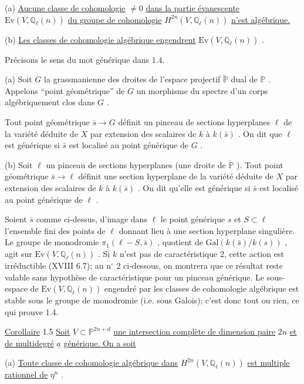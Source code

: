 (a) \underline{Aucune classe de cohomologie} $\neq 0$ \underline{dans la partie évanescente} $\mathrm{Ev}(V, \mathbb{Q}_\ell(n))$ \underline{du groupe de cohomologie} $H^{2n}(V, \mathbb{Q}_\ell(n))$ \underline{n'est algébrique.}

(b) \underline{Les classes de cohomologie algébrique engendrent} $\mathrm{Ev}(V, \mathbb{Q}_\ell(n))$ .

Précisons le sens du mot générique dans 1.4.

(a) Soit $G$ la grassmanienne des droites de l'espace projectif $\check{\mathbb{P}}$ dual de $\mathbb{P}$ . Appelons ``point géométrique'' de $G$ un morphisme du spectre d'un corps algébriquement clos dans $G$ .

Tout point géométrique $\bar{s} \to G$ définit un pinceau de sections hyperplanes $\ell$ de la variété déduite de $X$ par extension des scalaires de $k$ à $k(\bar{s})$ . On dit que $\ell$ est générique si $\bar{s}$ est localisé au point générique de $G$ .

(b) Soit $\ell$ un pinceau de sections hyperplanes (une droite de $\check{\mathbb{P}}$ ). Tout point géométrique $\bar{s} \to \ell$ définit une section hyperplane de la variété déduite de $X$ par extension des scalaires de $k$ à $k(\bar{s})$ . On dit qu'elle est générique si $\bar{s}$ est localisé au point générique de $\ell$ .

Soient $\bar{s}$ comme ci-dessus, d'image dans $\ell$ le point générique $s$ et $S \subset \ell$ l'ensemble fini des points de $\ell$ donnant lieu à une section hyperplane singulière. Le groupe de monodromie $\pi_1(\ell - S, \bar{s})$ , quotient de $\mathrm{Gal}(k(\bar{s})/k(s))$ , agit sur $\mathrm{Ev}(V, \mathbb{Q}_\ell(n))$ . Si $k$ n'est pas de caractéristique 2, cette action est irréductible (XVIII 6.7); au n$^{\circ}$ 2 ci-dessous, on montrera que ce résultat reste valable sans hypothèse de caractéristique pour un pinceau générique. Le sous-espace de $\mathrm{Ev}(V, \mathbb{Q}_\ell(n))$ engendré par les classes de cohomologie algébrique est stable sous le groupe de monodromie (i.e. sous Galois); c'est donc tout ou rien, ce qui prouve 1.4.



\underline{Corollaire} 1.5 \quad \underline{Soit} $V \subset \mathbb{P}^{2n+d}$ \underline{une intersection complète de dimension paire} $2n$ \underline{et de multidegré} $\underline{a}$ \underline{générique. On a soit}

(a) \underline{Toute classe de cohomologie algébrique dans} $H^{2n}(V, \mathbb{Q}_\ell(n))$ \underline{est multiple rationnel de} $\eta^n$ .

